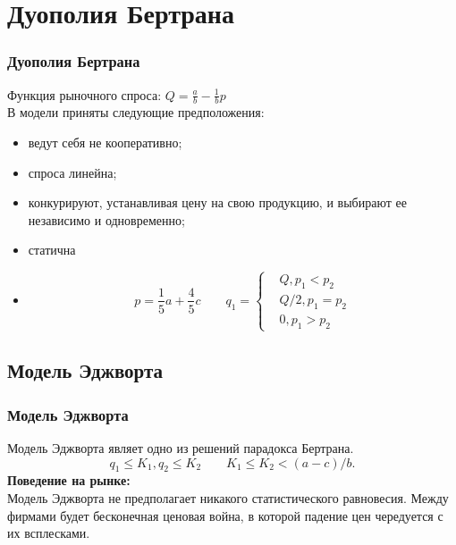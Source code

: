 \documentclass {beamer}
\begin{document}
\section{Дуополия Бертрана}
\begin{frame}

\frametitle{Дуополия Бертрана}
Функция рыночного спроса: $Q = \frac{a}{b}- \frac{1}{b}p$\\
В модели приняты следующие предположения: {\begin{itemize}\item {} ведут себя не кооперативно; 
\item {} спроса линейна; 
\item {} конкурируют, устанавливая цену на свою продукцию, и выбирают ее независимо и одновременно; 
\item {} статична\item \pause $$p=\frac{1}{5}a+\frac{4}{5}c\qquad q_1=\left\{ \begin{aligned} &Q, p_1<p_2 \\ &Q/2, p_1=p_2 \\& 0, p_1>p_2 \end{aligned}\right.$$
\end{itemize}}

\end{frame}

\begin{frame} 
\section{Модель Эджворта}
\frametitle{Модель Эджворта}
Модель Эджворта являет одно из решений парадокса Бертрана.
$$q_1  \le K_1, q_2 \le K_2 \qquad K_1 \le K_2 < (a-c) / b.$$
{\bf Поведение на рынке:\\}Модель Эджворта  не предполагает никакого статистического равновесия. Между фирмами будет бесконечная ценовая война, в которой падение цен чередуется с их всплесками.

\end{frame}
\end{document}
